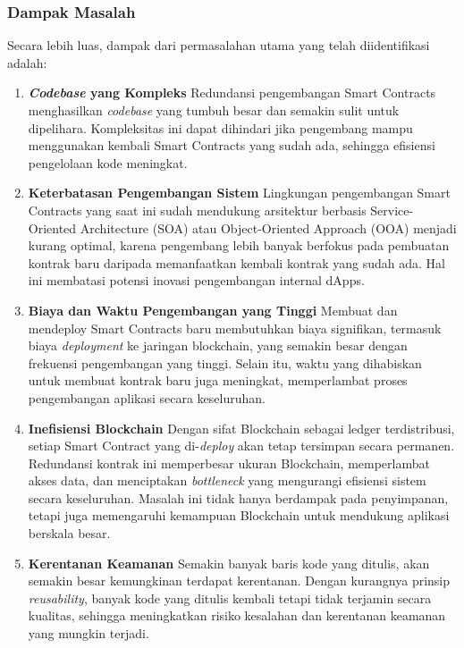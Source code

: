 \subsubsection{Dampak Masalah}
\label{subsubsec:dampak-masalah}

Secara lebih luas, dampak dari permasalahan utama yang telah diidentifikasi adalah:

\begin{enumerate}
	\item \textbf{\textit{Codebase} yang Kompleks} \newline
	      Redundansi pengembangan Smart Contracts menghasilkan \textit{codebase} yang tumbuh besar dan semakin sulit untuk dipelihara. Kompleksitas ini dapat dihindari jika pengembang mampu menggunakan kembali Smart Contracts yang sudah ada, sehingga efisiensi pengelolaan kode meningkat.
	\item \textbf{Keterbatasan Pengembangan Sistem} \newline
	      Lingkungan pengembangan Smart Contracts yang saat ini sudah mendukung arsitektur berbasis Service-Oriented Architecture (SOA) atau Object-Oriented Approach (OOA) menjadi kurang optimal, karena pengembang lebih banyak berfokus pada pembuatan kontrak baru daripada memanfaatkan kembali kontrak yang sudah ada. Hal ini membatasi potensi inovasi pengembangan internal dApps.
	\item \textbf{Biaya dan Waktu Pengembangan yang Tinggi} \newline
	      Membuat dan mendeploy Smart Contracts baru membutuhkan biaya signifikan, termasuk biaya \textit{deployment} ke jaringan blockchain, yang semakin besar dengan frekuensi pengembangan yang tinggi. Selain itu, waktu yang dihabiskan untuk membuat kontrak baru juga meningkat, memperlambat proses pengembangan aplikasi secara keseluruhan.
	\item \textbf{Inefisiensi Blockchain} \newline
	      Dengan sifat Blockchain sebagai ledger terdistribusi, setiap Smart Contract yang di-\textit{deploy} akan tetap tersimpan secara permanen. Redundansi kontrak ini memperbesar ukuran Blockchain, memperlambat akses data, dan menciptakan \textit{bottleneck} yang mengurangi efisiensi sistem secara keseluruhan. Masalah ini tidak hanya berdampak pada penyimpanan, tetapi juga memengaruhi kemampuan Blockchain untuk mendukung aplikasi berskala besar.
	\item \textbf{Kerentanan Keamanan} \newline
	      Semakin banyak baris kode yang ditulis, akan semakin besar kemungkinan terdapat kerentanan. Dengan kurangnya prinsip \textit{reusability}, banyak kode yang ditulis kembali tetapi tidak terjamin secara kualitas, sehingga meningkatkan risiko kesalahan dan kerentanan keamanan yang mungkin terjadi.
\end{enumerate}